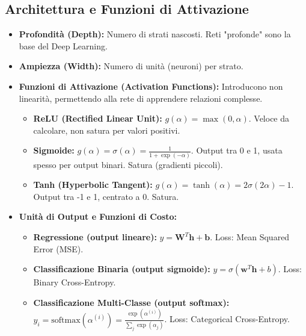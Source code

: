 \documentclass[a4paper,11pt]{article}
\begin{document}
\subsection{Architettura e Funzioni di Attivazione}
\begin{itemize}
    \item \textbf{Profondità (Depth):} Numero di strati nascosti. Reti "profonde" sono la base del Deep Learning.
    \item \textbf{Ampiezza (Width):} Numero di unità (neuroni) per strato.
    \item \textbf{Funzioni di Attivazione (Activation Functions):} Introducono non linearità, permettendo alla rete di apprendere relazioni complesse.
    \begin{itemize}
        \item \textbf{ReLU (Rectified Linear Unit):} $g(\alpha) = \max(0, \alpha)$. Veloce da calcolare, non satura per valori positivi.
        \item \textbf{Sigmoide:} $g(\alpha) = \sigma(\alpha) = \frac{1}{1 + \exp(-\alpha)}$. Output tra 0 e 1, usata spesso per output binari. Satura (gradienti piccoli).
        \item \textbf{Tanh (Hyperbolic Tangent):} $g(\alpha) = \tanh(\alpha) = 2\sigma(2\alpha) - 1$. Output tra -1 e 1, centrato a 0. Satura.
    \end{itemize}
    \item \textbf{Unità di Output e Funzioni di Costo:}
    \begin{itemize}
        \item \textbf{Regressione (output lineare):} $y = \mathbf{W}^T \mathbf{h} + \mathbf{b}$. Loss: Mean Squared Error (MSE).
        \item \textbf{Classificazione Binaria (output sigmoide):} $y = \sigma(\mathbf{w}^T \mathbf{h} + b)$. Loss: Binary Cross-Entropy.
        \item \textbf{Classificazione Multi-Classe (output softmax):} $y_i = \text{softmax}(\alpha^{(i)}) = \frac{\exp(\alpha^{(i)})}{\sum_j \exp(\alpha_j)}$. Loss: Categorical Cross-Entropy.
    \end{itemize}
\end{itemize}
\end{document}
